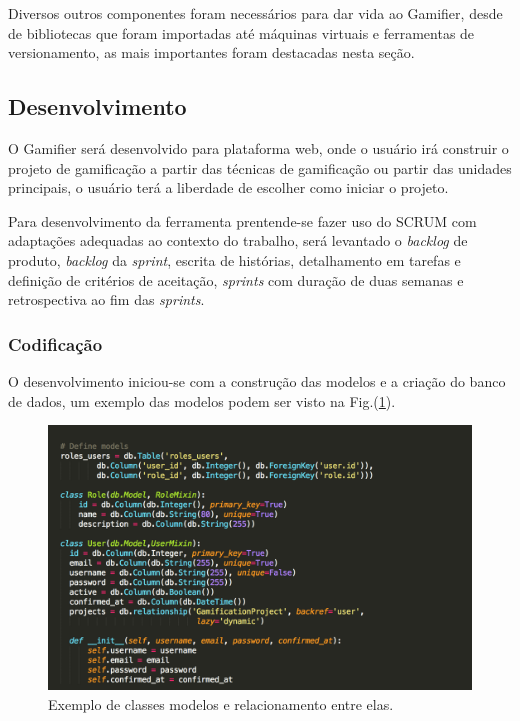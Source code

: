 Diversos outros componentes foram necessários para dar vida ao Gamifier, desde de bibliotecas que foram importadas até máquinas virtuais e ferramentas de versionamento, as mais importantes foram destacadas nesta seção. 

\subsection {Desenvolvimento}

O Gamifier será desenvolvido para plataforma web, onde o usuário irá construir o projeto de gamificação a partir das técnicas de gamificação ou partir das unidades principais, o usuário terá a liberdade de escolher como iniciar o projeto. 

Para desenvolvimento da ferramenta prentende-se fazer uso do SCRUM com adaptações adequadas ao contexto do trabalho, será levantado o \textit{backlog} de produto, \textit{backlog} da \textit{sprint}, escrita de histórias, detalhamento em tarefas e definição de critérios de aceitação, \textit{sprints} com duração de duas semanas e retrospectiva ao fim das \textit{sprints}.



\subsubsection {Codificação}

O desenvolvimento iniciou-se com a construção das modelos e a criação do banco de dados, um exemplo das modelos podem ser visto na Fig.(\ref{fig09}). 


\begin{figure}[h]
	\centering
		\includegraphics[keepaspectratio=true,scale=0.8]{figuras/modelo.png}
	\caption{Exemplo de classes modelos e relacionamento entre elas.\label{fig09}}
\end{figure}


